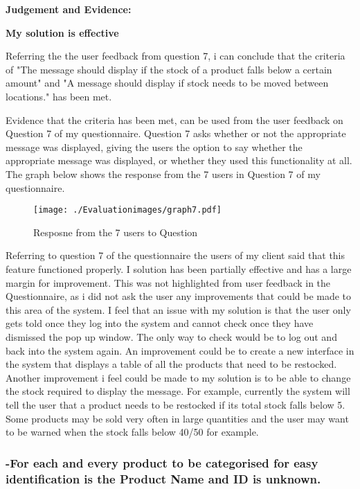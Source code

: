 \textbf{Judgement and Evidence:} \newline

\textbf{\large{My solution is effective}}

Referring the the user feedback from question 7, i can conclude that the criteria of "The message should display if the stock of a product falls below a certain amount" and "A message should display if stock needs to be moved between locations." has been met.

Evidence that the criteria has been met, can be used from the user feedback on Question 7 of my questionnaire. Question 7 asks whether or not the appropriate message was displayed, giving the users the option to say whether the appropriate message was displayed, or whether they used this functionality at all. The graph below shows the response from the 7 users in Question 7 of my questionnaire.

\begin{figure}[H]
\caption{Resposne from the 7 users to Question}
\hfill\texttt{[image: ./Evaluationimages/graph7.pdf]}
\end{figure}








Referring to question 7 of the questionnaire the users of my client said that this feature functioned properly. I solution has been partially effective and has a large margin for improvement. This was not highlighted from user feedback in the Questionnaire, as i did not ask the user any improvements that could be made to this area of the system. I feel that an issue with my solution is that the user only gets told once they log into the system and cannot check once they have dismissed the pop up window. The only way to check would be to log out and back into the system again. An improvement could be to create a new interface in the system that displays a table of all the products that need to be restocked. Another improvement i feel could be made to my solution is to be able to change the stock required to display the message. For example, currently the system will tell the user that a product needs to be restocked if its total stock falls below 5. Some products may be sold very often in large quantities and the user may want to be warned when the stock falls below 40/50 for example.




\pagebreak
\subsubsection{-For each and every product to be categorised for easy identification is the Product Name and ID is unknown.}

